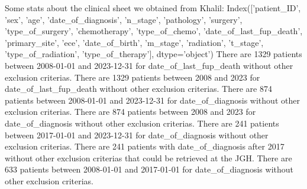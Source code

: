 \documentclass{article}%
\begin{document}
%
Some stats about the clinical sheet we obtained from Khalil: %
\newline%
\newline%
%
Index({[}'patient\_ID', 'sex', 'age', 'date\_of\_diagnosis', 'n\_stage', 'pathology',%
\newline%
\newline%
%
       'surgery', 'type\_of\_surgery', 'chemotherapy', 'type\_of\_chemo',%
\newline%
\newline%
%
       'date\_of\_last\_fup\_death', 'primary\_site', 'ece', 'date\_of\_birth',%
\newline%
\newline%
%
       'm\_stage', 'radiation', 't\_stage', 'type\_of\_radiation',%
\newline%
\newline%
%
       'type\_of\_therapy'{]},%
\newline%
\newline%
%
      dtype='object')%
\newline%
\newline%
%
There are 1329 patients between 2008{-}01{-}01 and 2023{-}12{-}31 for date\_of\_last\_fup\_death without other exclusion criterias.%
\newline%
\newline%
%
There are 1329 patients between 2008 and 2023 for date\_of\_last\_fup\_death without other exclusion criterias.%
\newline%
\newline%
%
There are 874 patients between 2008{-}01{-}01 and 2023{-}12{-}31 for date\_of\_diagnosis without other exclusion criterias.%
\newline%
\newline%
%
There are 874 patients between 2008 and 2023 for date\_of\_diagnosis without other exclusion criterias.%
\newline%
\newline%
%
There are 241 patients between 2017{-}01{-}01 and 2023{-}12{-}31 for date\_of\_diagnosis without other exclusion criterias.%
\newline%
\newline%
%
There are 241 patients with date\_of\_diagnosis after 2017 without other exclusion criterias that could be retrieved at the JGH.%
\newline%
\newline%
%
There are 633 patients between 2008{-}01{-}01 and 2017{-}01{-}01 for date\_of\_diagnosis without other exclusion criterias.%
\end{document}
